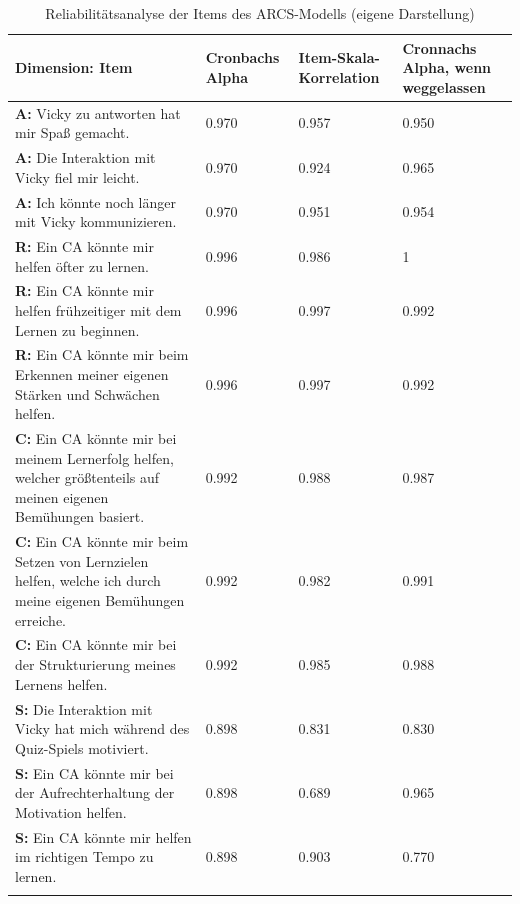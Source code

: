 \begin{longtable}{|m{8cm}|m{2cm}|m{2cm}|m{2cm}|}
    \hline
    \rowcolor[HTML]{EFEFEF} 
    \centering \textbf{Dimension: Item} &   \centering \textbf{Cronbachs Alpha}  &\centering \textbf{Item-Skala-Korrelation} &\centering \arraybackslash \textbf{Cronnachs Alpha, wenn weggelassen}\\    \hline \hline
     \textbf{A:} Vicky zu antworten hat mir Spaß gemacht. & 0.970 & 0.957 & 0.950                    \\ \hline 

      \textbf{A:} Die Interaktion mit Vicky fiel mir leicht.  & 0.970 & 0.924 & 0.965                    \\ \hline

     \textbf{A:} Ich könnte noch länger mit Vicky kommunizieren. & 0.970  & 0.951 & 0.954                     \\ \hline\hline


     \textbf{R:} Ein CA könnte mir helfen öfter zu lernen. & 0.996 & 0.986 & 1                    \\ \hline 

      \textbf{R:}  Ein CA könnte mir helfen frühzeitiger mit dem Lernen zu beginnen.  & 0.996 & 0.997 & 0.992                    \\ \hline

     \textbf{R:} Ein CA könnte mir beim Erkennen meiner eigenen Stärken und Schwächen helfen. & 0.996  & 0.997 & 0.992                     \\ \hline\hline


     \textbf{C:} Ein CA könnte mir bei meinem Lernerfolg helfen, welcher größtenteils auf meinen eigenen Bemühungen basiert. & 0.992 & 0.988 & 0.987                    \\ \hline 

      \textbf{C:}  Ein CA könnte mir beim Setzen von Lernzielen helfen, welche ich durch meine eigenen Bemühungen erreiche.  & 0.992 & 0.982 & 0.991                    \\ \hline

     \textbf{C:} Ein CA könnte mir bei der Strukturierung meines Lernens helfen. & 0.992  & 0.985 & 0.988                     \\ \hline\hline


     \textbf{S:} Die Interaktion mit Vicky hat mich während des Quiz-Spiels motiviert. & 0.898 & 0.831 & 0.830                    \\ \hline 

      \textbf{S:}  Ein CA könnte mir bei der Aufrechterhaltung der Motivation helfen.  & 0.898 & 0.689 & 0.965                    \\ \hline

     \textbf{S:} Ein CA könnte mir helfen im richtigen Tempo zu lernen. & 0.898  & 0.903 & 0.770                     \\ \hline\hline

    \caption[Reliabilitätsanalyse der Items des ARCS-Modells]{Reliabilitätsanalyse der Items des ARCS-Modells (eigene Darstellung)} 
    \label{tab:/Reliabilitätsanalyse_ARCS}
\end{longtable}
\endgroup

